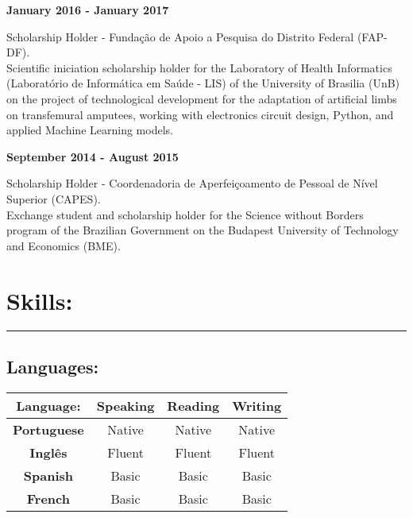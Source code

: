 \documentclass[11pt]{article}
\begin{document}
\textbf{January 2016 - January 2017}
\begin{addmargin}{0.5cm}
Scholarship Holder - Fundação de Apoio a Pesquisa do Distrito Federal (FAP-DF).\\
Scientific iniciation scholarship holder for the Laboratory of Health Informatics
(Laboratório de Informática em Saúde - LIS) of the University of
Brasilia (UnB) on the project of technological development for the adaptation of artificial
limbs on transfemural amputees, working with electronics circuit design, Python, and applied
Machine Learning models. \\

\end{addmargin}

\textbf{September 2014 - August 2015}
\begin{addmargin}{0.5cm}
Scholarship Holder - Coordenadoria de Aperfeiçoamento de Pessoal de Nível Superior (CAPES). \\
Exchange student and scholarship holder for the Science without Borders program of the Brazilian
Government on the Budapest University of Technology and Economics (BME). \\
\end{addmargin}

\section{Skills:}
\hrule \vspace{0.1cm}

\subsection{Languages:}
\begin{center}
\begin{tabular}{c | c | c | c}
\hline
\textbf{Language:} & Speaking  & Reading & Writing \\
\hline
\hline
\textbf{Portuguese} &  Native & Native & Native  \\
\hline
\textbf{Inglês} &  Fluent & Fluent & Fluent  \\
\hline
\textbf{Spanish} & Basic & Basic & Basic \\
\hline
\textbf{French} & Basic & Basic & Basic \\
\hline
\end{tabular}
\end{center}
\end{document}
